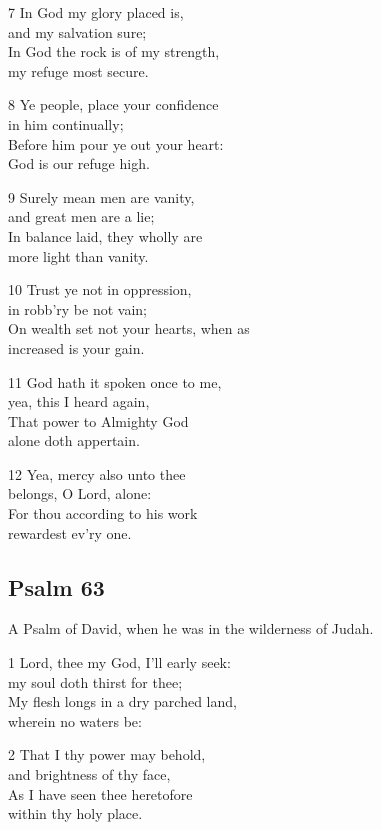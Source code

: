 7 In God my glory placed is,\\
and my salvation sure;\\
In God the rock is of my strength,\\
my refuge most secure.

8 Ye people, place your confidence\\
in him continually;\\
Before him pour ye out your heart:\\
God is our refuge high.

9 Surely mean men are vanity,\\
and great men are a lie;\\
In balance laid, they wholly are\\
more light than vanity.

10 Trust ye not in oppression,\\
in robb’ry be not vain;\\
On wealth set not your hearts, when as\\
increased is your gain.

11 God hath it spoken once to me,\\
yea, this I heard again,\\
That power to Almighty God\\
alone doth appertain.

12 Yea, mercy also unto thee\\
belongs, O Lord, alone:\\
For thou according to his work\\
rewardest ev’ry one.

\begin{center}
\quad{}\quad{}
\end{center}

\subsection*{Psalm 63}

A Psalm of David, when he was in the wilderness of Judah.

1 Lord, thee my God, I’ll early seek:\\
my soul doth thirst for thee;\\
My flesh longs in a dry parched land,\\
wherein no waters be:

2 That I thy power may behold,\\
and brightness of thy face,\\
As I have seen thee heretofore\\
within thy holy place.


